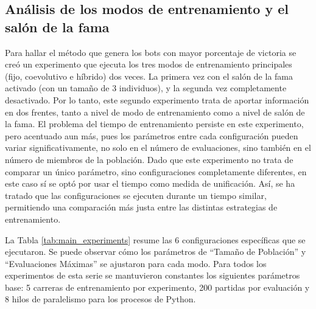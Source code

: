 \subsection{Análisis de los modos de entrenamiento y el salón de la fama} \label{sec:experimentos_modos_entrenamiento}

Para hallar el método que genera los bots con mayor porcentaje de victoria se creó un experimento que ejecuta los tres modos de entrenamiento principales (fijo, coevolutivo e híbrido) dos veces. La primera vez con el salón de la fama activado (con un tamaño de 3 individuos), y la segunda vez completamente desactivado. Por lo tanto, este segundo experimento trata de aportar información en dos frentes, tanto a nivel de modo de entrenamiento como a nivel de salón de la fama. El problema del tiempo de entrenamiento persiste en este experimento, pero acentuado aun más, pues los parámetros entre cada configuración pueden variar significativamente, no solo en el número de evaluaciones, sino también en el número de miembros de la población. Dado que este experimento no trata de comparar un único parámetro, sino configuraciones completamente diferentes, en este caso sí se optó por usar el tiempo como medida de unificación. Así, se ha tratado que las configuraciones se ejecuten durante un tiempo similar, permitiendo una comparación más justa entre las distintas estrategias de entrenamiento.

La Tabla \ref{tab:main_experiments} resume las 6 configuraciones específicas que se ejecutaron. Se puede observar cómo los parámetros de ``Tamaño de Población'' y ``Evaluaciones Máximas'' se ajustaron para cada modo. Para todos los experimentos de esta serie se mantuvieron constantes los siguientes parámetros base: 5 carreras de entrenamiento por experimento, 200 partidas por evaluación y 8 hilos de paralelismo para los procesos de Python.

